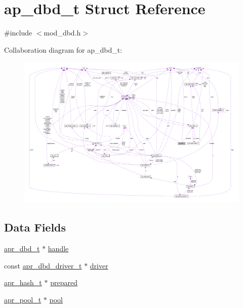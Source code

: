 \hypertarget{structap__dbd__t}{}\section{ap\+\_\+dbd\+\_\+t Struct Reference}
\label{structap__dbd__t}


{\ttfamily \#include $<$mod\+\_\+dbd.\+h$>$}



Collaboration diagram for ap\+\_\+dbd\+\_\+t\+:
\nopagebreak
\begin{figure}[H]
\begin{center}
\leavevmode
\includegraphics[width=350pt]{structap__dbd__t__coll__graph}
\end{center}
\end{figure}
\subsection*{Data Fields}
\begin{DoxyCompactItemize}
\item 
\hyperlink{group__APR__Util__DBD_ga4738c1f6340184987fc7806522c18ab8}{apr\+\_\+dbd\+\_\+t} $\ast$ \hyperlink{structap__dbd__t_af825005efce580e86b16ae2031b5218a}{handle}
\item 
const \hyperlink{structapr__dbd__driver__t}{apr\+\_\+dbd\+\_\+driver\+\_\+t} $\ast$ \hyperlink{structap__dbd__t_aae4c35411195f3a7700b0e0414c689ee}{driver}
\item 
\hyperlink{structapr__hash__t}{apr\+\_\+hash\+\_\+t} $\ast$ \hyperlink{structap__dbd__t_ad8f9283ad51cb317aabd04784498cb92}{prepared}
\item 
\hyperlink{structapr__pool__t}{apr\+\_\+pool\+\_\+t} $\ast$ \hyperlink{structap__dbd__t_a851280460a614980589795f12140d7f5}{pool}
\end{DoxyCompactItemize}


